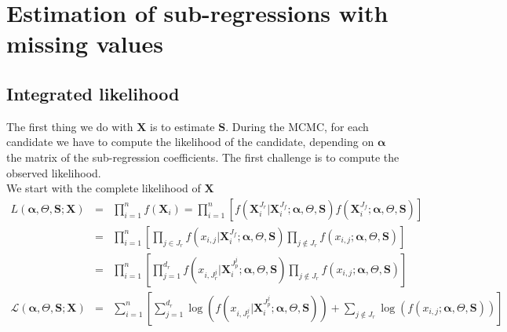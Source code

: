 \documentclass[12pt,a4paper]{report}
\begin{document}
\section{Estimation of sub-regressions with missing values}
\subsection{Integrated likelihood}
The first thing we do with $\boldsymbol{X}$ is to estimate $\boldsymbol{S}$.
	 During the MCMC, for each candidate we have to compute the likelihood of the candidate, depending on $\boldsymbol{\alpha}$ the matrix of the sub-regression coefficients. The first challenge is to compute the observed likelihood.\\
	 
We start with the complete likelihood of $\boldsymbol{X}$
\begin{eqnarray}
	L(\boldsymbol{\alpha},\Theta,\boldsymbol{S};\boldsymbol{X})&=& \prod_{i=1}^n f(\boldsymbol{X}_i)= \prod_{i=1}^n\left[f(\boldsymbol{X}_i^{J_r}|\boldsymbol{X}_i^{J_f};\boldsymbol{\alpha},\Theta,\boldsymbol{S})f(\boldsymbol{X}_i^{J_f};\boldsymbol{\alpha},\Theta,\boldsymbol{S}) \right] \\
	&=&\prod_{i=1}^n\left[\prod_{j \in J_r}f(x_{i,j}|\boldsymbol{X}_i^{J_f};\boldsymbol{\alpha},\Theta,\boldsymbol{S})\prod_{j \notin J_r} f(x_{i,j};\boldsymbol{\alpha},\Theta,\boldsymbol{S}) \right] \\
	&=&\prod_{i=1}^n\left[\prod_{j =1}^{d_r}f(x_{i,J_r^j}|\boldsymbol{X}_i^{J_p^j};\boldsymbol{\alpha},\Theta,\boldsymbol{S})\prod_{j \notin J_r} f(x_{i,j};\boldsymbol{\alpha},\Theta,\boldsymbol{S}) \right] \\
	\mathcal{L}(\boldsymbol{\alpha},\Theta,\boldsymbol{S};\boldsymbol{X})&=&\sum_{i=1}^n\left[\sum_{j =1}^{d_r}\log \left(f(x_{i,J_r^j}|\boldsymbol{X}_i^{J_p^j};\boldsymbol{\alpha},\Theta,\boldsymbol{S})\right)+\sum_{j \notin J_r} \log \left(f(x_{i,j};\boldsymbol{\alpha},\Theta,\boldsymbol{S})\right) \right] \label{loglikmiss}
\end{eqnarray}
\end{document}
